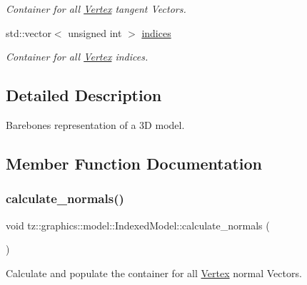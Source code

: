 \begin{DoxyCompactItemize}
\begin{DoxyCompactList}\small\item\em Container for all \mbox{\hyperlink{class_vertex}{Vertex}} tangent Vectors. \end{DoxyCompactList}\item 
\mbox{\label{classtz_1_1graphics_1_1model_1_1_indexed_model_a1b87b564e60fdb25df24515567fa4040}} 
std\+::vector$<$ unsigned int $>$ \mbox{\hyperlink{classtz_1_1graphics_1_1model_1_1_indexed_model_a1b87b564e60fdb25df24515567fa4040}{indices}}
\begin{DoxyCompactList}\small\item\em Container for all \mbox{\hyperlink{class_vertex}{Vertex}} indices. \end{DoxyCompactList}\end{DoxyCompactItemize}


\subsection{Detailed Description}
Barebones representation of a 3D model. 

\subsection{Member Function Documentation}
\mbox{\label{classtz_1_1graphics_1_1model_1_1_indexed_model_a019b4f8c72e1e7dd37d2d3ec452cfa3b}} 
\subsubsection{\texorpdfstring{calculate\+\_\+normals()}{calculate\_normals()}}
{\footnotesize\ttfamily void tz\+::graphics\+::model\+::\+Indexed\+Model\+::calculate\+\_\+normals (\begin{DoxyParamCaption}{ }\end{DoxyParamCaption})}

Calculate and populate the container for all \mbox{\hyperlink{class_vertex}{Vertex}} normal Vectors. \mbox{\label{classtz_1_1graphics_1_1model_1_1_indexed_model_ae5dae45074924bcdfbc2adf2ec13f0ec}} 

